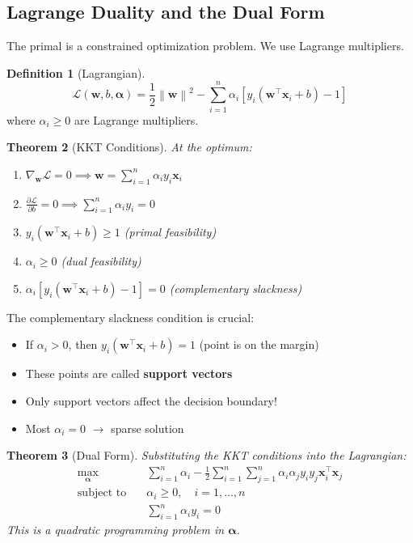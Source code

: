 \documentclass[11pt,twoside]{article}
\numberwithin{equation}{section}
\newcommand{\vect}[1]{\bm{#1}}
\newcommand{\norm}[1]{\left\lVert#1\right\rVert}
\newcommand{\pp}[2]{\frac{\partial #1}{\partial #2}}
\theoremstyle{plain}
\newtheorem{theorem}{Theorem}[section]
\theoremstyle{definition}
\newtheorem{definition}[theorem]{Definition}
\theoremstyle{remark}
\newenvironment{keyidea}{
  \begin{tcolorbox}[colback=yellow!5!white,
                    colframe=yellow!50!black,
                    title=Key Idea,
                    breakable,
                    enhanced,
                    sharp corners,
                    boxrule=0.8pt,
                    left=6pt, right=6pt, top=6pt, bottom=6pt]
}{
  \end{tcolorbox}
}
\begin{document}
\subsection{Lagrange Duality and the Dual Form}

The primal is a constrained optimization problem. We use Lagrange multipliers.

\begin{definition}[Lagrangian]
\begin{equation}\label{eq:svm-lagrangian}
\mathcal{L}(\vect{w}, b, \vect{\alpha}) = \frac{1}{2}\norm{\vect{w}}^2 - \sum_{i=1}^n \alpha_i[y_i(\vect{w}^\top\vect{x}_i + b) - 1]
\end{equation}
where $\alpha_i \geq 0$ are Lagrange multipliers.
\end{definition}

\begin{theorem}[KKT Conditions]
At the optimum:
\begin{enumerate}
\item $\nabla_{\vect{w}} \mathcal{L} = 0 \implies \vect{w} = \sum_{i=1}^n \alpha_i y_i \vect{x}_i$
\item $\pp{\mathcal{L}}{b} = 0 \implies \sum_{i=1}^n \alpha_i y_i = 0$
\item $y_i(\vect{w}^\top\vect{x}_i+b)\geq1$ (primal feasibility)
\item $\alpha_i \geq 0$ (dual feasibility)
\item $\alpha_i [y_i(\vect{w}^\top\vect{x}_i + b) - 1] = 0$ (complementary slackness)
\end{enumerate}
\end{theorem}

\begin{keyidea}
The complementary slackness condition is crucial:
\begin{itemize}
\item If $\alpha_i > 0$, then $y_i(\vect{w}^\top\vect{x}_i + b) = 1$ (point is on the margin)
\item These points are called \textbf{support vectors}
\item Only support vectors affect the decision boundary!
\item Most $\alpha_i = 0$ $\to$ sparse solution
\end{itemize}
\end{keyidea}

\begin{theorem}[Dual Form]
Substituting the KKT conditions into the Lagrangian:
\begin{equation}\label{eq:svm-dual}
\begin{aligned}
\max_{\vect{\alpha}} \quad & \sum_{i=1}^n \alpha_i - \frac{1}{2}\sum_{i=1}^n\sum_{j=1}^n \alpha_i\alpha_j y_i y_j \vect{x}_i^\top\vect{x}_j \\
\text{subject to} \quad & \alpha_i \geq 0, \quad i = 1, \ldots, n \\
& \sum_{i=1}^n \alpha_i y_i = 0
\end{aligned}
\end{equation}
This is a \emph{quadratic programming} problem in $\vect{\alpha}$.
\end{theorem}
\end{document}
